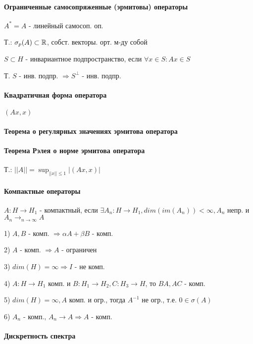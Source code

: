\documentclass[russian,twocolumn]{article}
\begin{document}
\paragraph{Ограниченные самосопряженные (эрмитовы) операторы}

$A^* = A$ - линейный самосоп. оп.

Т.: $\sigma_p(A) \subset \Bbb R$, собст. векторы. орт. м-ду собой

$S \subset H$ - инвариантное подпространство, если $\forall x \in S : Ax \in S$

Т. $S$ - инв. подпр. $\Rightarrow S^\perp $ - инв. подпр. 

\paragraph{Квадратичная форма оператора} $(Ax, x)$

\paragraph{Теорема о регулярных значениях эрмитова оператора}

\paragraph{Теорема Рэлея о норме эрмитова оператора}

Т.: $||A|| = \sup _{||x|| \le 1} |(Ax,x)|$

\paragraph{Компактные операторы}

$A:H \to H_1$ - компактный, если $\exists A_n : H \to H_1 , dim(im(A_n)) < \infty, A_n$ непр. и $A_n \to _{n \to \infty} A$

1) $A,B$ - комп. $\Rightarrow \alpha A + \beta B$ - комп.

2) $A$ - комп. $\Rightarrow A$ - ограничен

3) $dim(H) = \infty \Rightarrow I $ - не комп.

4) $A:H \to H_1$ комп. и $B:H_1 \to H_2, C : H_3 \to H$, то $BA, AC$ - комп.

5) $dim(H) = \infty,A$ комп. и огр., тогда $A^{-1}$ не огр., т.е. $0 \in \sigma(A)$

6) $A_n$ - комп., $A_n \to A \Rightarrow A$ - комп.

\paragraph{Дискретность спектра}
 
\end{document}
